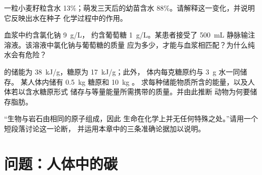 \begin{exercise}[$\star\star\star$]\label{exo:g10:chemistry-of-life:12}
一粒小麦籽粒含水 13\%；萌发三天后的幼苗含水
88\%。请解释这一变化，并说明它反映出水在种子
化学过程中的作用。
\end{exercise}

\begin{exercise}[$\star\star\star$]\label{exo:g10:chemistry-of-life:13}
血浆中约含氯化钠 \qty{9}{g/L}，
约含葡萄糖 \qty{1}{g/L}。某患者接受了 \qty{500}{mL}
静脉输注溶液。该溶液中氯化钠与葡萄糖的质量
应为多少，才能与血浆相匹配？为什么纯水会有危险？
\end{exercise}

\begin{exercise}[$\star\star\star$]\label{exo:g10:chemistry-of-life:14}
的储能为 \qty{38}{kJ/g}，糖原为 \qty{17}{kJ/g}；此外，
体内每克糖原约与 \qty{3}{g} 水一同储存。
某人体内储有 \qty{0.5}{kg} 糖原和 \qty{10}{kg} 。
求每种储能物质所含的能量，以及人体若以含水糖原形式
储存与等量能量所需携带的质量。并由此推断
动物为何要储存脂肪。
\end{exercise}

\begin{exercise}[$\star\star\star$]\label{exo:g10:chemistry-of-life:15}
“生物与岩石由相同的原子组成，因此
生命在化学上并无任何特殊之处。”请用一个短段落讨论这一论断，
并运用本章中的三条准确论据加以说明。
\end{exercise}

\section{问题：人体中的碳}

